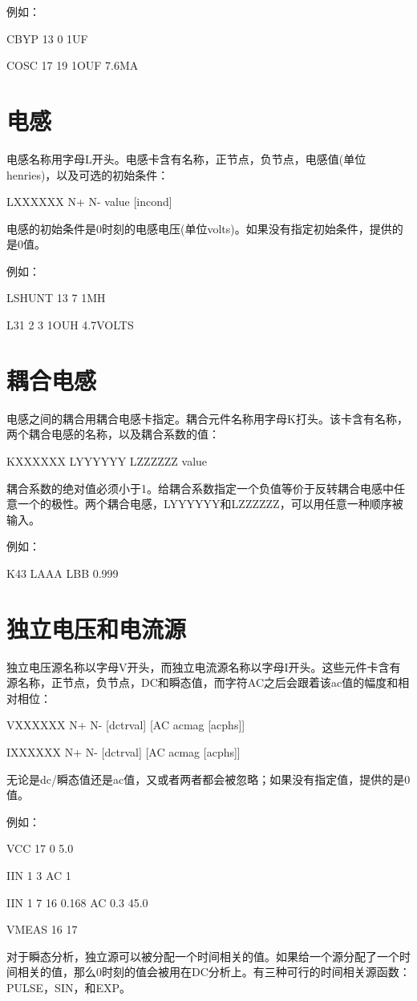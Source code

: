 例如：

CBYP 13 0 1UF

COSC 17 19 1OUF 7.6MA

\section{电感}
电感名称用字母L开头。电感卡含有名称，正节点，负节点，电感值(单位henries)，以及可选的初始条件：

LXXXXXX N+ N- value [incond]

电感的初始条件是0时刻的电感电压(单位volts)。如果没有指定初始条件，提供的是0值。

例如：

LSHUNT 13 7 1MH

L31 2 3 1OUH 4.7VOLTS

\section{耦合电感}
电感之间的耦合用耦合电感卡指定。耦合元件名称用字母K打头。该卡含有名称，两个耦合电感的名称，以及耦合系数的值：

KXXXXXX LYYYYYY LZZZZZZ value

耦合系数的绝对值必须小于1。给耦合系数指定一个负值等价于反转耦合电感中任意一个的极性。两个耦合电感，LYYYYYY和LZZZZZZ，可以用任意一种顺序被输入。

例如：

K43 LAAA LBB 0.999

\section{独立电压和电流源}
独立电压源名称以字母V开头，而独立电流源名称以字母I开头。这些元件卡含有源名称，正节点，负节点，DC和瞬态值，而字符AC之后会跟着该ac值的幅度和相对相位：

VXXXXXX N+ N- [dctrval] [AC acmag [acphs]]

IXXXXXX N+ N- [dctrval] [AC acmag [acphs]]

无论是dc/瞬态值还是ac值，又或者两者都会被忽略；如果没有指定值，提供的是0值。

例如：

VCC 17 0 5.0

IIN 1 3 AC 1

IIN 1 7 16 0.168 AC 0.3 45.0

VMEAS 16 17

对于瞬态分析，独立源可以被分配一个时间相关的值。如果给一个源分配了一个时间相关的值，那么0时刻的值会被用在DC分析上。有三种可行的时间相关源函数：PULSE，SIN，和EXP。

